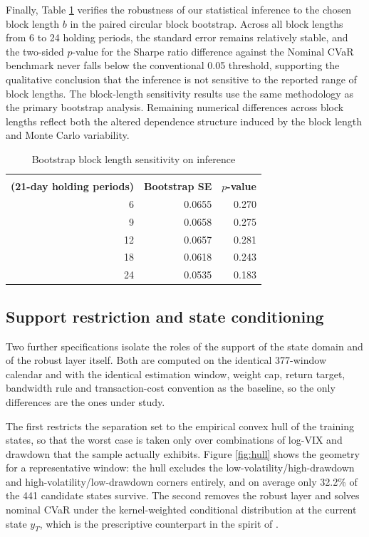 \documentclass[smallextended]{svjour3}
\begin{document}
Finally, Table \ref{tab:sens_block} verifies the robustness of our statistical inference to the chosen block length $b$ in the paired circular block bootstrap. Across all block lengths from 6 to 24 holding periods, the standard error remains relatively stable, and the two-sided $p$-value for the Sharpe ratio difference against the Nominal CVaR benchmark never falls below the conventional 0.05 threshold, supporting the qualitative conclusion that the inference is not sensitive to the reported range of block lengths. The block-length sensitivity results use the same methodology as the primary bootstrap analysis. Remaining numerical differences across block lengths reflect both the altered dependence structure induced by the block length and Monte Carlo variability.

\begin{table}[htbp]
\centering
\caption{Bootstrap block length sensitivity on inference}
\label{tab:sens_block}
\begin{tabular}{rrr}
\toprule
\makecell[r]{\textbf{Block length $b$}\\\textbf{(21-day holding periods)}} & \textbf{Bootstrap SE} & \textbf{$p$-value} \\
\midrule
6 & 0.0655 & 0.270 \\
9 & 0.0658 & 0.275 \\
12 & 0.0657 & 0.281 \\
18 & 0.0618 & 0.243 \\
24 & 0.0535 & 0.183 \\
\bottomrule
\end{tabular}
\end{table}


\subsection{Support restriction and state conditioning}
\label{sec:referee_benchmarks}
Two further specifications isolate the roles of the support of the state domain
and of the robust layer itself. Both are computed on the identical 377-window
calendar and with the identical estimation window, weight cap, return target,
bandwidth rule and transaction-cost convention as the baseline, so the only
differences are the ones under study.

The first restricts the separation set to the empirical convex hull of the
training states, so that the worst case is taken only over combinations of
log-VIX and drawdown that the sample actually exhibits. Figure
\ref{fig:hull} shows the geometry for a representative window: the hull excludes
the low-volatility/high-drawdown and high-volatility/low-drawdown corners
entirely, and on average only 32.2\% of the 441 candidate states survive. The
second removes the robust layer and solves nominal CVaR under the
kernel-weighted conditional distribution at the current state $y_T$, which is
the prescriptive counterpart in the spirit of \citet{bertsimas2020predictive}.
\end{document}
